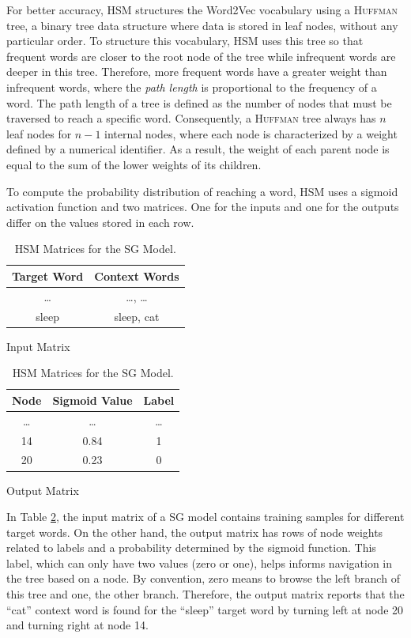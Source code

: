 For better accuracy, HSM structures the Word2Vec vocabulary using a
\textsc{Huffman} tree, a binary tree data structure where data is stored in leaf
nodes, without any particular order. To structure this vocabulary, HSM uses this
tree so that frequent words are closer to the root node of the tree while
infrequent words are deeper in this tree. Therefore, more frequent words have a
greater weight than infrequent words, where the \emph{path length} is
proportional to the frequency of a word. The path length of a tree is defined as
the number of nodes that must be traversed to reach a specific
word. Consequently, a \textsc{Huffman} tree always has $n$ leaf nodes for $n-1$
internal nodes, where each node is characterized by a weight defined by a
numerical identifier. As a result, the weight of each parent node is equal to
the sum of the lower weights of its children.

To compute the probability distribution of reaching a word, HSM uses a sigmoid
activation function and two matrices. One for the inputs and one for the outputs
differ on the values stored in each row.
\begin{table}[!ht]
  \centering
  \begin{subtable}[b]{0.5\textwidth}
    \centering
    \begin{tabular}{cc}
      \toprule
      \textbf{Target Word} & \textbf{Context Words} \\
      \midrule
      \dots & \dots, \dots \\
      sleep & sleep, cat \\
      \bottomrule
    \end{tabular}
    \caption{Input Matrix}
  \end{subtable}%
  \begin{subtable}[b]{0.5\textwidth}
    \centering
    \begin{tabular}{ccc}
      \toprule
      \textbf{Node} & \textbf{Sigmoid Value} &  \textbf{Label} \\
      \midrule
      \dots & \dots & \dots \\
      14 & 0.84 & 1 \\
      20 & 0.23 & 0 \\
      \bottomrule
    \end{tabular}
    \caption{Output Matrix}
  \end{subtable}
  \caption{HSM Matrices for the SG Model.}
  \label{fig:w2v:hsm:matrices}
\end{table}

In Table \ref{fig:w2v:hsm:matrices}, the input matrix of a SG model contains
training samples for different target words. On the other hand, the output
matrix has rows of node weights related to labels and a probability determined
by the sigmoid function. This label, which can only have two values (zero or
one), helps informs navigation in the tree based on a node. By convention, zero
means to browse the left branch of this tree and one, the other
branch. Therefore, the output matrix reports that the ``cat'' context word is
found for the ``sleep'' target word by turning left at node 20 and turning right
at node 14.

